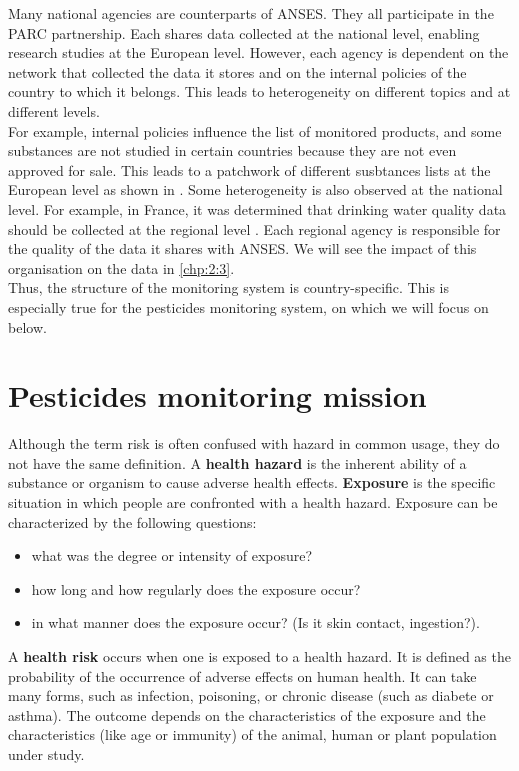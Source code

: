 Many national agencies are counterparts of ANSES. They all participate in the PARC partnership. Each shares data collected at the national level, enabling research studies at the European level. However, each agency is dependent on the network that collected the data it stores and on the internal policies of the country to which it belongs. This leads to heterogeneity on different topics and at different levels. \\
For example, internal policies influence the list of monitored products, and some substances are not studied in certain countries because they are not even approved for sale. This leads to a patchwork of different susbtances lists at the European level as shown in \cite{Baran2022}. Some heterogeneity is also observed at the national level. For example, in France, it was determined that drinking water quality data should be collected at the regional level \cite{Baran2022}. Each regional agency is responsible for the quality of the data it shares with ANSES. We will see the impact of this organisation on the data in \ref{chp:2:3}. \\
Thus, the structure of the monitoring system is country-specific. This is especially true for the pesticides monitoring system, on which we will focus on below.

\section{Pesticides monitoring mission}\label{chp:2:2}

Although the term risk is often confused with hazard in common usage, they do not have the same definition. A \textbf{health hazard} is the inherent ability of a substance or organism to cause adverse health effects. \textbf{Exposure} is the specific situation in which people are confronted with a health hazard. Exposure can be characterized by the following questions:
\begin{itemize}
\item what was the degree or intensity of exposure?
\item how long and how regularly does the exposure occur? 
\item in what manner does the exposure occur? (Is it skin contact, ingestion?). 
\end{itemize}
A \textbf{health risk} occurs when one is exposed to a health hazard. It is defined as the probability of the occurrence of adverse effects on human health. It can take many forms, such as infection, poisoning, or chronic disease (such as diabete or asthma). The outcome depends on the characteristics of the exposure and the characteristics (like age or immunity) of the animal, human or plant population under study.

